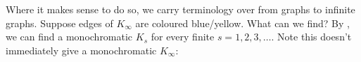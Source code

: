 \documentclass{article}
\begin{document}
Where it makes sense to do so, we carry terminology over from graphs to infinite graphs.
Suppose edges of $K_\infty$ are coloured blue/yellow. What can we find? By , we can find a monochromatic $K_s$ for every finite $s = 1, 2, 3, \dotsc$. Note this doesn't immediately give a monochromatic $K_\infty$:
\end{document}
